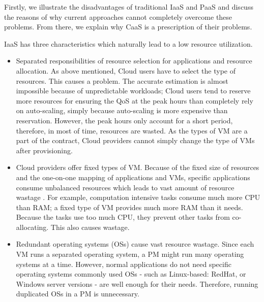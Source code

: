 Firstly, we illustrate the disadvantages of traditional IaaS and PaaS and discuss the reasons of why current approaches cannot completely overcome these problems. From there, we explain why CaaS is a prescription of their problems.

IaaS has three characteristics which naturally lead to a low resource utilization.
\begin{itemize}
	\item Separated responsibilities of resource selection for applications and resource allocation. 
	As above mentioned, Cloud users have to select the type of resources. This causes a problem. The accurate estimation is almost impossible because of unpredictable workloads; Cloud users tend to reserve more resources for ensuring the QoS at the peak hours \cite{Chaisiri:2012cv} than completely rely on auto-scaling, simply because auto-scaling is more expensive than reservation. However, the peak hours only account for a short period, therefore, in most of time, resources are wasted. As the types of VM are a part of the contract, Cloud providers cannot simply change the type of VMs after provisioning. 

	\item Cloud providers offer fixed types of VM. Because of the fixed size of resources and the one-on-one mapping of applications and VMs, specific applications consume unbalanced resources which leads to vast amount of resource wastage \cite{Tomas:2013iv}. For example, computation intensive tasks consume much more CPU than RAM; a fixed type of VM provides much more RAM than it needs. Because the tasks use too much CPU, they prevent other tasks from co-allocating. This also causes wastage. 

	\item Redundant operating systems (OSs) cause vast resource wastage. Since each VM runs a separated operating system, a PM might run many operating systems at a time. However, normal applications do not need specific operating systems commonly used OSs - such as Linux-based: RedHat, or Windows server versions - are well enough for their needs. Therefore, running duplicated OSs in a PM is unnecessary.
\end{itemize}

